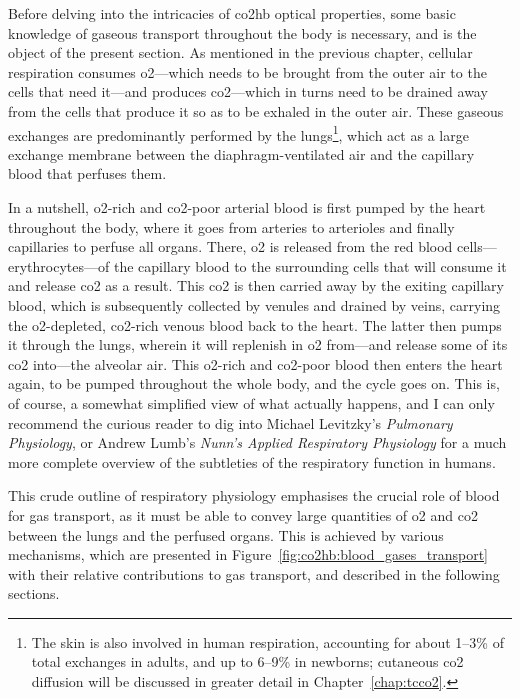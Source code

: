 Before delving into the intricacies of \gls{co2hb} optical properties, some basic knowledge of gaseous transport throughout the body is necessary, and is the object of the present section. As mentioned in the previous chapter, cellular respiration consumes \gls{o2}---which needs to be brought from the outer air to the cells that need it---and produces \gls{co2}---which in turns need to be drained away from the cells that produce it so as to be exhaled in the outer air. These gaseous exchanges are predominantly performed by the lungs\footnote{The skin is also involved in human respiration, accounting for about 1--3\% of total exchanges in adults\cite{fitzgerald1957}, and up to 6--9\% in newborns\cite{evans1986}; cutaneous \gls{co2} diffusion will be discussed in greater detail in Chapter~\ref{chap:tcco2}.}, which act as a large exchange membrane between the diaphragm-ventilated air and the capillary blood that perfuses them.

In a nutshell, \gls{o2}-rich and \gls{co2}-poor arterial blood is first pumped by the heart throughout the body, where it goes from arteries to arterioles and finally capillaries to perfuse all organs. There, \gls{o2} is released from the red blood cells---\aka{} erythrocytes---of the capillary blood to the surrounding cells that will consume it and release \gls{co2} as a result. This \gls{co2} is then carried away by the exiting capillary blood, which is subsequently collected by venules and drained by veins, carrying the \gls{o2}-depleted, \gls{co2}-rich venous blood back to the heart. The latter then pumps it through the lungs, wherein it will replenish in \gls{o2} from---and release some of its \gls{co2} into---the alveolar air. This \gls{o2}-rich and \gls{co2}-poor blood then enters the heart again, to be pumped throughout the whole body, and the cycle goes on. This is, of course, a somewhat simplified view of what actually happens, and I can only recommend the curious reader to dig into Michael Levitzky's \textit{Pulmonary Physiology}\cite{levitzky2003pulmonary}, or Andrew Lumb's  \textit{Nunn's Applied Respiratory Physiology}\cite{nunns} for a much more complete overview of the subtleties of the respiratory function in humans.

This crude outline of respiratory physiology emphasises the crucial role of blood for gas transport, as it must be able to convey large quantities of \gls{o2} and \gls{co2} between the lungs and the perfused organs. This is achieved by various mechanisms, which are presented in Figure~\ref{fig:co2hb:blood_gases_transport} with their relative contributions to gas transport, and described in the following sections.

